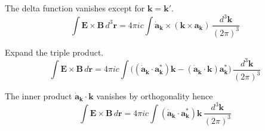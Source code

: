 The delta function vanishes except for $\mathbf k=\mathbf k'$.
\begin{equation*}
\int\mathbf E\times\mathbf B\,d^3\mathbf r
=4\pi ic\int\dot{\mathbf a}_{\mathbf k}\times(\mathbf k\times\mathbf a_{\mathbf k})
\,\frac{d^3\mathbf k}{(2\pi)^3}
\end{equation*}

Expand the triple product.
\begin{equation*}
\int\mathbf E\times\mathbf B\,d\mathbf r
=4\pi ic\int
\bigl((\dot{\mathbf a}_{\mathbf k}\cdot\mathbf a_{\mathbf k}^*)\mathbf k
-(\dot{\mathbf a}_{\mathbf k}\cdot\mathbf k)\mathbf a_{\mathbf k}^*\bigr)
\,\frac{d^3\mathbf k}{(2\pi)^3}
\end{equation*}

The inner product $\dot{\mathbf a}_{\mathbf k}\cdot\mathbf k$
vanishes by orthogonality hence
\begin{equation*}
\int\mathbf E\times\mathbf B\,d\mathbf r
=4\pi ic\int
(\dot{\mathbf a}_{\mathbf k}\cdot\mathbf a_{\mathbf k}^*)\mathbf k
\,\frac{d^3\mathbf k}{(2\pi)^3}
\end{equation*}


